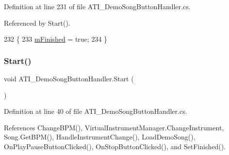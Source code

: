 Definition at line 231 of file A\+T\+I\+\_\+\+Demo\+Song\+Button\+Handler.\+cs.



Referenced by Start().


\begin{DoxyCode}
232     \{
233         \hyperlink{class_a_t_i___demo_song_button_handler_a4a9d01d8ee385c66a6a27da6d9d94f18}{mFinished} = \textcolor{keyword}{true};
234     \}
\end{DoxyCode}
\mbox{\label{class_a_t_i___demo_song_button_handler_a723e9581adb3cbc7198af345b8c88b66}} 
\subsubsection{\texorpdfstring{Start()}{Start()}}
{\footnotesize\ttfamily void A\+T\+I\+\_\+\+Demo\+Song\+Button\+Handler.\+Start (\begin{DoxyParamCaption}{ }\end{DoxyParamCaption})\hspace{0.3cm}{\ttfamily [private]}}



Definition at line 40 of file A\+T\+I\+\_\+\+Demo\+Song\+Button\+Handler.\+cs.



References Change\+B\+P\+M(), Virtual\+Instrument\+Manager.\+Change\+Instrument, Song.\+Get\+B\+P\+M(), Handle\+Instrument\+Change(), Load\+Demo\+Song(), On\+Play\+Pause\+Button\+Clicked(), On\+Stop\+Button\+Clicked(), and Set\+Finished().


